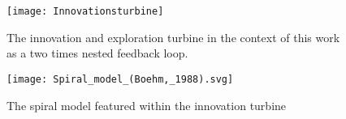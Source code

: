 \begin{figure}[h]
    \centering
    \texttt{[image: Innovationsturbine]}
    \caption{The innovation and exploration turbine in the context of this work as a two times nested feedback loop. \cite{adlakha-hutcheon_human_2022}}
    \label{fig:innovation_turbine}
\end{figure}

\begin{figure}[h]
    \centering
    \texttt{[image: Spiral\_model\_(Boehm,\_1988).svg]}
    \caption{The spiral model featured within the innovation turbine \cite{boehm_spiral_1986}}
    \label{fig:spiral model}
\end{figure}


